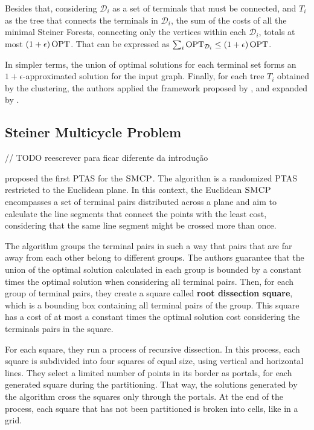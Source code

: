 Besides that, considering \(\mathcal{D}_i\) as a set of terminals that must be connected, and \(T_i\) as the tree that connects the terminals in \(\mathcal{D}_i\), the sum of the costs of all the minimal Steiner Forests, connecting only the vertices within each \(\mathcal{D}_i\), totals at most \((1 + \epsilon) \operatorname{\textrm{OPT}}\). That can be expressed as \(\sum_i \operatorname{\textrm{OPT}}_{\mathcal{D}_i} \leq (1 + \epsilon) \operatorname{\textrm{OPT}}\).

In simpler terms, the union of optimal solutions for each terminal set forms an \(1 + \epsilon\)-approximated solution for the input graph. Finally, for each tree \(T_i\) obtained by the clustering, the authors applied the framework proposed by \cite{KleinTSP}, and expanded by \cite{Borradaile2009b, Borradaile2012}.

\subsection{Steiner Multicycle Problem} \label{subsection:steinermulticycle}

// TODO reescrever para ficar diferente da introdução

\cite{LINTZMAYER2020134} proposed the first PTAS for the \(\textsc{SMCP}\). The algorithm is a randomized PTAS restricted to the Euclidean plane. In this context, the Euclidean \(\textsc{SMCP}\) encompasses a set of terminal pairs distributed across a plane and aim to calculate the line segments that connect the points with the least cost, considering that the same line segment might be crossed more than once.

The algorithm groups the terminal pairs in such a way that pairs that are far away from each other belong to different groups. The authors guarantee that the union of the optimal solution calculated in each group is bounded by a constant times the optimal solution when considering all terminal pairs. Then, for each group of terminal pairs, they create a square called \textbf{root dissection square}, which is a bounding box containing all terminal pairs of the group. This square has a cost of at most a constant times the optimal solution cost considering the terminals pairs in the square.

For each square, they run a process of recursive dissection. In this process, each square is subdivided into four squares of equal size, using vertical and horizontal lines. They select a limited number of points in its border as portals, for each generated square during the partitioning. That way, the solutions generated by the algorithm cross the squares only through the portals. At the end of the process, each square that has not been partitioned is broken into cells, like in a grid. 

